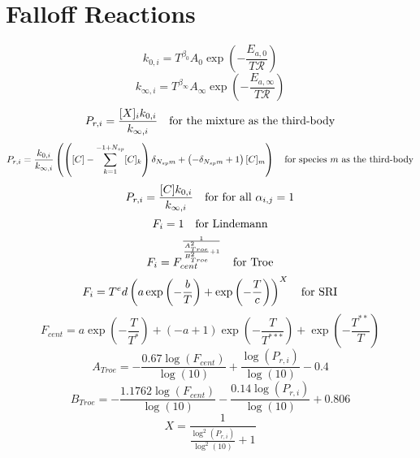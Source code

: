 \documentclass[a4paper,10pt]{article}
\newcommand{\ns}{N_{sp}}
\newcommand{\Ru}{\mathcal{R}}
\begin{document}
\section{Falloff Reactions}
\begin{dmath} k_{0, i} = T^{\beta_0} A_{0} \operatorname{exp}\left({- \frac{E_{a, 0}}{T \Ru}}\right)\end{dmath} 
\begin{dmath} k_{\infty, i} = T^{\beta_{\infty}} A_{\infty} \operatorname{exp}\left({- \frac{E_{a, \infty}}{T \Ru}}\right)\end{dmath} 
\begin{dmath} P_{r, i}=\frac{[X]_{i} k_{0, i}}{k_{\infty, i}}\text{\quad for the mixture as the third-body}\end{dmath} 
\begin{dmath} P_{r, i}=\frac{k_{0, i}}{k_{\infty, i}} \left(\left([C] - \sum_{k=1}^{-1 + \ns} [C]_{k}\right) \delta_{\ns m} + \left(- \delta_{\ns m} + 1\right) [C]_{m}\right)\text{\quad for species $m$ as the third-body}\end{dmath} 
\begin{dmath} P_{r, i}=\frac{[C] k_{0, i}}{k_{\infty, i}}\text{\quad for for all $\alpha_{i, j} = 1$}\end{dmath} 
\begin{dmath} F_{i}=1\text{\quad for Lindemann}\end{dmath} 
\begin{dmath} F_{i}=F_{cent}^{\frac{1}{\frac{A_{Troe}^{2}}{B_{Troe}^{2}} + 1}}\text{\quad for Troe}\end{dmath} 
\begin{dmath} F_{i}=T^{e} d \left(a \operatorname{exp}\left({- \frac{b}{T}}\right) + \operatorname{exp}\left({- \frac{T}{c}}\right)\right)^{X}\text{\quad for SRI}\end{dmath} 
\begin{dmath} F_{cent} = a \operatorname{exp}\left({- \frac{T}{T^{*}}}\right) + \left(- a + 1\right) \operatorname{exp}\left({- \frac{T}{T^{***}}}\right) + \operatorname{exp}\left({- \frac{T^{**}}{T}}\right)\end{dmath} 
\begin{dmath} A_{Troe} = - \frac{0.67 \log{\left (F_{cent} \right )}}{\log{\left (10 \right )}} + \frac{\log{\left (P_{r, i} \right )}}{\log{\left (10 \right )}} - 0.4\end{dmath} 
\begin{dmath} B_{Troe} = - \frac{1.1762 \log{\left (F_{cent} \right )}}{\log{\left (10 \right )}} - \frac{0.14 \log{\left (P_{r, i} \right )}}{\log{\left (10 \right )}} + 0.806\end{dmath} 
\begin{dmath} X = \frac{1}{\frac{\log^{2}{\left (P_{r, i} \right )}}{\log^{2}{\left (10 \right )}} + 1}\end{dmath} 
\end{document}
